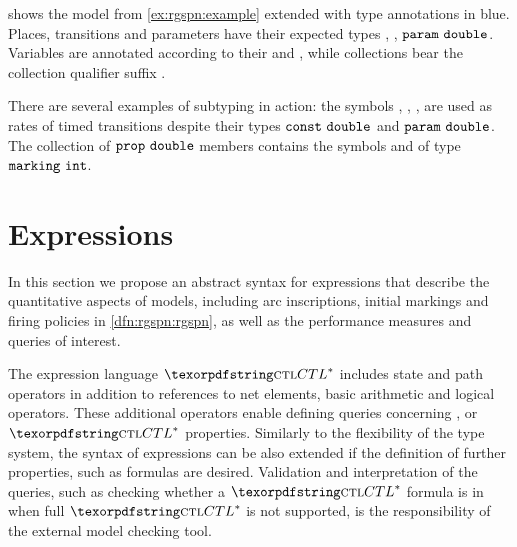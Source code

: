 \begin{runningExample}
   shows the model from \vref{ex:rgspn:example} extended with type annotations in blue. Places, transitions and parameters have their expected types , , \(\texttt{\upshape param}\ \texttt{\upshape double}\). Variables are annotated according to their  and , while collections bear the collection qualifier suffix \lit{[]}.

  There are several examples of subtyping in action: the symbols , , ,  are used as rates of timed transitions despite their types \(\texttt{\upshape const}\ \texttt{\upshape double}\) and \(\texttt{\upshape param}\ \texttt{\upshape double}\). The collection  of \(\texttt{\upshape prop}\ \texttt{\upshape double}\) members contains the symbols  and  of type \(\texttt{\upshape marking}\ \texttt{\upshape int}\).
\end{runningExample}

\section{Expressions}
\label{sec:rgspn:expression}

In this section we propose an abstract syntax for expressions that describe the quantitative aspects of  models, including arc inscriptions, initial markings and firing policies in \vref{dfn:rgspn:rgspn}, as well as the performance measures and queries of interest.

The expression language \(\textabbr{CTL}^*\) includes state and path operators in addition to references to net elements, basic arithmetic and logical operators. These additional operators enable defining queries concerning ,  or \(\textabbr{CTL}^*\) properties. Similarly to the flexibility of the type system, the syntax of expressions can be also extended if the definition of further properties, such as  formulas are desired. Validation and interpretation of the queries, such as checking whether a \(\textabbr{CTL}^*\) formula is in  when full \(\textabbr{CTL}^*\) is not supported, is the responsibility of the external model checking tool.

